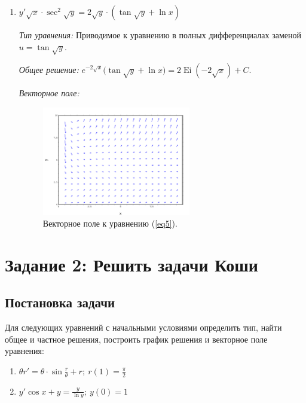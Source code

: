 \documentclass[14pt, a4paper, titlepage, fleqn]{extarticle}
\DeclareMathOperator{\Ei}{Ei}
\begin{document}
\begin{enumerate}
                \item \(
                        y' \sqrt{x} \cdot \sec^2{\sqrt{y}} = 2\sqrt{y} \cdot 
                        \left( \tan{\sqrt{y}+\ln{x}} \right)
                    \) \label{eq5}

                    \textit{Тип уравнения:}
                        Приводимое к уравнению в полных дифференциалах заменой \( u = \tan{\sqrt{y}} \). %

                    \textit{Общее решение:}
                        \(
                            \displaystyle
                            e^{-2\sqrt{x}} \big( \tan{\sqrt{y}} + \ln{x} \big) = 2\Ei \left(-2 \sqrt{x} \right) + C.
                        \)

                    \textit{Векторное поле:}

                        \begin{figure}[H]
                            \centering
                            \includegraphics[width=6.5cm]{pictures/vector_field_5.pdf}
                            \caption{Векторное поле к уравнению (\ref{eq5}).}
                        \end{figure}
            \end{enumerate}

    
    \pagebreak

    \section{Задание 2: Решить задачи Коши}

        \subsection{Постановка задачи}
            Для следующих уравнений с начальными условиями определить тип, найти
            общее и частное решения, построить график решения и векторное поле уравнения:
        
            \begin{enumerate}
                \item \(
                        \displaystyle
                        \theta r' = \theta \cdot \sin{\frac{r}{\theta}} + r; ~ r(1) = \frac{\pi}{2}
                    \)

                \item \(
                        \displaystyle
                        y' \cos{x} + y = \frac{y}{\ln{y}}; ~ y(0) = 1 
                    \)
            \end{enumerate}
\end{document}
